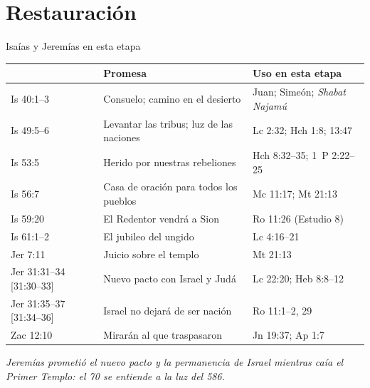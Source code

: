 \section{Restauración}
\begin{frame}{Isaías y Jeremías en esta etapa}
\centering\scriptsize\renewcommand{\arraystretch}{1.18}
\begin{tabular}{>{\RaggedRight\arraybackslash}p{2.4cm}>{\RaggedRight\arraybackslash}p{4.8cm}>{\RaggedRight\arraybackslash}p{4.4cm}}
\toprule
{\color{ladrillo}\bfseries Texto} & {\color{ladrillo}\bfseries Promesa} & {\color{ladrillo}\bfseries Uso en esta etapa}\\\midrule
Is 40:1--3 & Consuelo; camino en el desierto & Juan; Simeón; \emph{Shabat Najamú}\\
Is 49:5--6 & Levantar las tribus; luz de las naciones & Lc 2:32; Hch 1:8; 13:47\\
Is 53:5 & Herido por nuestras rebeliones & Hch 8:32--35; 1~P 2:22--25\\
Is 56:7 & Casa de oración para todos los pueblos & Mc 11:17; Mt 21:13\\
Is 59:20 & El Redentor vendrá a Sion & Ro 11:26 (Estudio 8)\\
Is 61:1--2 & El jubileo del ungido & Lc 4:16--21\\
Jer 7:11 & Juicio sobre el templo & Mt 21:13\\
Jer 31:31--34 [31:30--33] & Nuevo pacto con Israel y Judá & Lc 22:20; Heb 8:8--12\\
Jer 31:35--37 [31:34--36] & Israel no dejará de ser nación & Ro 11:1--2, 29\\
Zac 12:10 & Mirarán al que traspasaron & Jn 19:37; Ap 1:7\\
\bottomrule
\end{tabular}
\elabpropia
\vspace{3pt}
{\footnotesize\itshape\color{sepia}Jeremías prometió el nuevo pacto y la permanencia de Israel mientras caía el Primer Templo: el 70 se entiende a la luz del 586.}
\end{frame}

